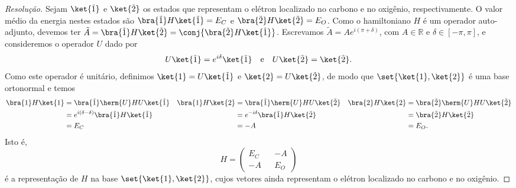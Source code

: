 \begin{proof}[Resolução]
    Sejam \(\ket{\tilde{1}}\) e \(\ket{\tilde{2}}\) os estados que representam o elétron localizado no carbono e no oxigênio, respectivamente. O valor médio da energia nestes estados são \(\bra{\tilde{1}}H\ket{\tilde{1}} = E_C\) e \(\bra{\tilde{2}}H\ket{\tilde{2}} = E_O\). Como o hamiltoniano \(H\) é um operador auto-adjunto, devemos ter \(\tilde{A} = \bra{\tilde{1}}H\ket{\tilde{2}} = \conj{\bra{\tilde{2}}H\ket{\tilde{1}}}\). Escrevamos \(\tilde{A} = Ae^{i(\pi + \delta)}\), com \(A \in \mathbb{R}\) e \(\delta \in [-\pi, \pi]\), e consideremos o operador \(U\) dado por
    \begin{equation*}
        U\ket{\tilde{1}} = e^{i \delta} \ket{\tilde{1}}\quad\text{e}\quad U\ket{\tilde{2}} = \ket{\tilde{2}}.
    \end{equation*}
    Como este operador é unitário, definimos \(\ket{1} = U\ket{\tilde{1}}\) e \(\ket{2} = U\ket{\tilde{2}}\), de modo que \(\set{\ket{1}, \ket{2}}\) é uma base ortonormal e temos
    \begin{align*}
        \bra{1}H\ket{1} &= \bra{\tilde{1}}\herm{U}HU\ket{\tilde{1}}&
        \bra{1}H\ket{2} &= \bra{\tilde{1}}\herm{U}HU\ket{\tilde{2}}&
        \bra{2}H\ket{2} &= \bra{\tilde{2}}\herm{U}HU\ket{\tilde{2}}\\
                        &= e^{i(\delta - \delta)} \bra{\tilde{1}}H\ket{\tilde{1}}&
                        &= e^{-i\delta} \bra{\tilde{1}}H\ket{\tilde{2}}&
                        &= \bra{\tilde{2}}H\ket{\tilde{2}}\\
                        &= E_C&
                        &= -A&
                        &= E_O.
    \end{align*}
    Isto é,
    \begin{equation*}
        H = \begin{pmatrix}
            E_C && -A\\
            -A && E_O
        \end{pmatrix}
    \end{equation*}
    é a representação de \(H\) na base \(\set{\ket{1}, \ket{2}}\), cujos vetores ainda representam o elétron localizado no carbono e no oxigênio.


\end{proof}

